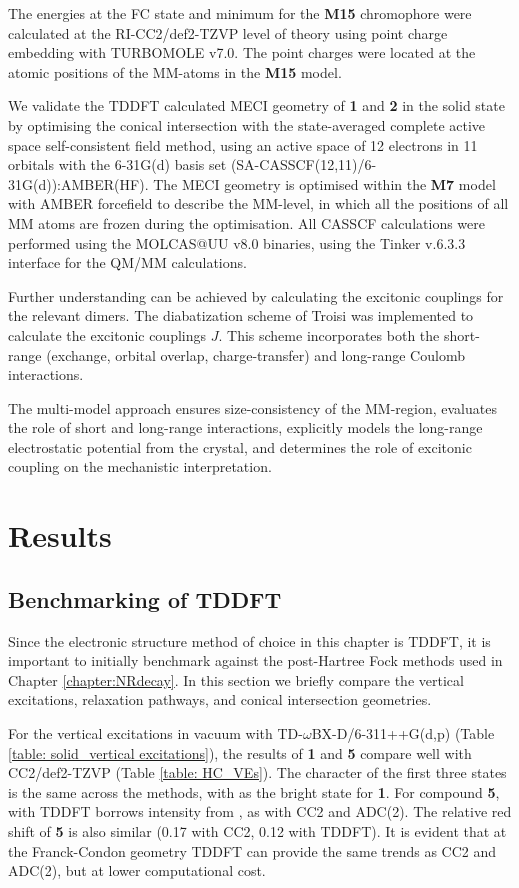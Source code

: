 The energies at the FC state and \Kstar{} minimum for the \textbf{M15} chromophore were calculated at the RI-CC2/def2-TZVP level of theory using point charge embedding with TURBOMOLE v7.0.\cite{Hattig2002,Turbomole} The point charges were located at the atomic positions of the MM-atoms in the \textbf{M15} model.

We validate the TDDFT calculated MECI geometry of \textbf{1} and \textbf{2} in the solid state by optimising the conical intersection with the state-averaged complete active space self-consistent field  method, using an active space of 12 electrons in 11 orbitals with the 6-31G(d) basis set (SA-CASSCF(12,11)/6-31G(d)):AMBER(HF). The MECI geometry is optimised within the \textbf{M7} model with AMBER forcefield to describe the MM-level, in which all the positions of all MM atoms are frozen during the optimisation. All CASSCF calculations were performed using the MOLCAS@UU v8.0 binaries, using  the Tinker v.6.3.3 interface for the QM/MM calculations. 

Further understanding can be achieved by calculating the excitonic couplings for the relevant dimers. The diabatization scheme of Troisi was implemented to calculate the excitonic couplings $J$.\cite{Arago2015} This scheme incorporates both the short-range (exchange, orbital overlap, charge-transfer) and long-range Coulomb interactions. 

The multi-model approach ensures size-consistency of the MM-region, evaluates the role of short and long-range interactions, explicitly models the long-range electrostatic potential from the crystal, and determines the role of excitonic coupling on the mechanistic interpretation.
\section{Results}\label{section: Inter_Results}
\subsection{Benchmarking of TDDFT}\label{section: Inter_benchmark}
Since the electronic structure method of choice in this chapter is \ac{TDDFT}, it is important to initially benchmark against the post-Hartree Fock methods used in Chapter \ref{chapter:NRdecay}. In this section we briefly compare the vertical excitations, relaxation pathways, and conical intersection geometries.

For the vertical excitations in vacuum with TD-$\omega$BX-D/6-311++G(d,p) (Table \ref{table: solid_vertical excitations}), the results of \textbf{1} and \textbf{5} compare well with CC2/def2-TZVP (Table \ref{table: HC_VEs}). The character of the first three states is the same across the  methods, with \sone{} as the bright state \pipistar{} for \textbf{1}. For compound \textbf{5}, with TDDFT \stwo{} borrows intensity from \sone{}, as with CC2 and ADC(2). The relative red shift of \textbf{5} is also similar (0.17 with CC2, 0.12 with TDDFT). It is evident that at the Franck-Condon geometry TDDFT can provide the same trends as CC2 and ADC(2), but at lower computational cost.

